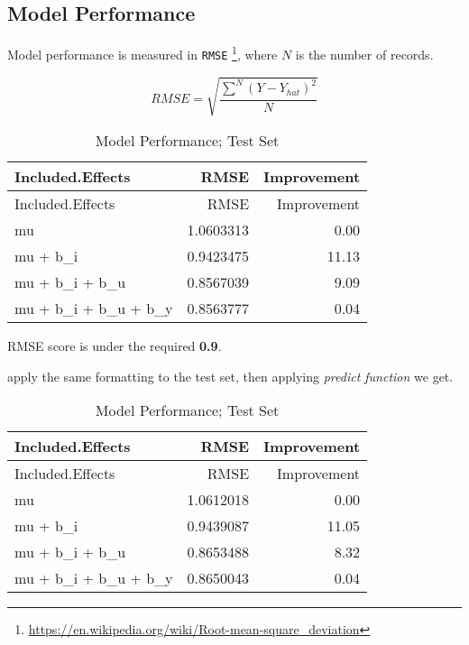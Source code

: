 \documentclass[]{article}
\newenvironment{Shaded}{\begin{snugshade}}{\end{snugshade}}
\newcommand{\KeywordTok}[1]{\textcolor[rgb]{0.13,0.29,0.53}{\textbf{#1}}}
\newcommand{\StringTok}[1]{\textcolor[rgb]{0.31,0.60,0.02}{#1}}
\newcommand{\OperatorTok}[1]{\textcolor[rgb]{0.81,0.36,0.00}{\textbf{#1}}}
\newcommand{\NormalTok}[1]{#1}
\let\rmarkdownfootnote\footnote%
\def\footnote{\protect\rmarkdownfootnote}
\begin{document}
\subsection{Model Performance}\label{model-performance}

Model performance is measured in \texttt{RMSE} \footnote{\url{https://en.wikipedia.org/wiki/Root-mean-square_deviation}},
where \(N\) is the number of records.

\[
RMSE = \sqrt {\frac{\sum_{}^{N} (Y - Y_{hat})^2}{N}}
\]

\begin{Shaded}
\end{Shaded}

\begin{longtable}[]{@{}lrr@{}}
\caption{Model Performance; Test Set}\tabularnewline
\toprule
Included.Effects & RMSE & Improvement\tabularnewline
\midrule
\endfirsthead
\toprule
Included.Effects & RMSE & Improvement\tabularnewline
\midrule
\endhead
mu & 1.0603313 & 0.00\tabularnewline
mu + b\_i & 0.9423475 & 11.13\tabularnewline
mu + b\_i + b\_u & 0.8567039 & 9.09\tabularnewline
mu + b\_i + b\_u + b\_y & 0.8563777 & 0.04\tabularnewline
\bottomrule
\end{longtable}

RMSE score is under the required \textbf{0.9}.

apply the same formatting to the test set, then applying \emph{predict
function} we get.

\begin{Shaded}
\end{Shaded}

\begin{longtable}[]{@{}lrr@{}}
\caption{Model Performance; Test Set}\tabularnewline
\toprule
Included.Effects & RMSE & Improvement\tabularnewline
\midrule
\endfirsthead
\toprule
Included.Effects & RMSE & Improvement\tabularnewline
\midrule
\endhead
mu & 1.0612018 & 0.00\tabularnewline
mu + b\_i & 0.9439087 & 11.05\tabularnewline
mu + b\_i + b\_u & 0.8653488 & 8.32\tabularnewline
mu + b\_i + b\_u + b\_y & 0.8650043 & 0.04\tabularnewline
\bottomrule
\end{longtable}
\end{document}
